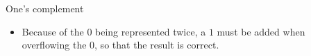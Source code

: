 \documentclass[11pt,compress,t,notes=noshow, xcolor=table]{beamer}
\begin{document}
\begin{vbframe}{One's complement}
\vspace{-0.5cm}
\begin{itemize}
  \item Because of the $0$ being represented twice, a $1$ must be added when overflowing the $0$, so that the result is correct.
\end{itemize}

%
%
%
%
%
%

%
%
%
%

\end{vbframe}
\end{document}
